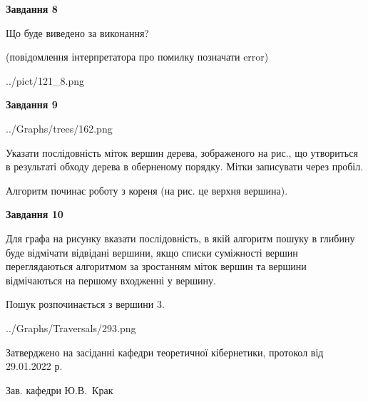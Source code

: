 \documentclass[12pt, ukrainian]{article}
\begin{document}
{\begin {large}
{\begin {center}\textbf{Завдання 8}\end {center}}\par
Що буде виведено за виконання?\par
 (повідомлення інтерпретатора про помилку позначати error)\par
\begin{center}
	{../pict/121_8.png}
\end{center}
\newpage

{\begin {center}\textbf{Завдання 9}\end {center}}\par

\begin{center}
	{../Graphs/trees/162.png}
\end{center}
Указати послідовність міток вершин дерева, зображеного на рис., що утвориться в результаті обходу дерева в оберненому порядку. Мітки записувати через пробіл.\par Алгоритм починає роботу з кореня (на рис. це верхня вершина).\par
\newpage

{\begin {center}\textbf{Завдання 10}\end {center}}\par
Для графа на рисунку вказати послідовність, в якій алгоритм пошуку в глибину буде відмічати відвідані вершини, якщо списки суміжності вершин переглядаються алгоритмом за зростанням міток вершин та вершини відмічаються на першому вход\-женні у вершину.\par
Пошук розпочинається з вершини 3.\par

\begin{center}
	{../Graphs/Traversals/293.png}
\end{center}\par
\newpage


\end {large}
}
{\smallskip \begin {small} Затверджено на засіданні кафедри теоретичної кібернетики, протокол  від   29.01.2022 р.\par\smallskip\smallskip
{\parbox {6.5 cm}{Зав. кафедри \dotfill Ю.В.~Крак}} \end{small}}
\end{document}
